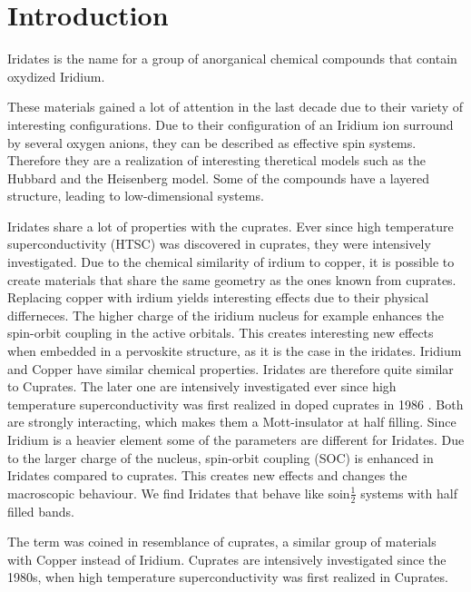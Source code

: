\chapter{Introduction}

Iridates is the name for a group of anorganical chemical compounds that contain oxydized Iridium.

These materials gained a lot of attention in the last decade due to their variety of interesting configurations.
Due to their configuration of an Iridium ion surround by several oxygen anions, they can be described as effective spin systems.
Therefore they are a realization of interesting theretical models such as the Hubbard and the Heisenberg model.
Some of the compounds have a layered structure, leading to low-dimensional systems.


Iridates share a lot of properties with the cuprates. 
Ever since high temperature superconductivity (HTSC) was discovered in cuprates, 
they were intensively investigated. 
Due to the chemical similarity of irdium to copper, it is possible to create materials that share the same geometry as the ones known from cuprates.
Replacing copper with irdium yields interesting effects due to their physical differneces.
The higher charge of the iridium nucleus for example enhances the spin-orbit coupling in the active orbitals.
This creates interesting new effects when embedded in a pervoskite structure, as it is the case in the iridates.
%
%
Iridium and Copper have similar chemical properties. 
Iridates are therefore quite similar to Cuprates. 
The later one are intensively investigated ever since high temperature superconductivity was first realized in doped cuprates in 1986 \cite{}.
Both are strongly interacting, which makes them a Mott-insulator at half filling.
Since Iridium is a heavier element some of the parameters are different for Iridates. 
Due to the larger charge of the nucleus, spin-orbit coupling (SOC) is enhanced in Iridates compared to cuprates.
This creates new effects and changes the macroscopic behaviour. 
We find Iridates that behave like soin$\frac12$ systems with half filled bands. 



The term was coined in resemblance of cuprates, a similar group of materials with Copper instead of Iridium.
Cuprates are intensively investigated since the 1980s, when high temperature superconductivity was first realized in Cuprates.


